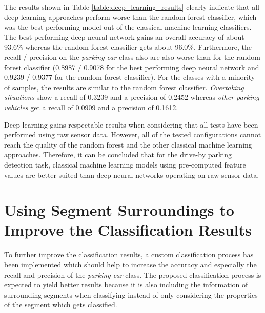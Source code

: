 The results shown in Table \ref{table:deep_learning_results} clearly indicate that all deep learning approaches perform worse than the random forest classifier, which was the best performing model out of the classical machine learning classifiers. The best performing deep neural network gains an overall accuracy of about 93.6\% whereas the random forest classifier gets about 96.0\%. Furthermore, the recall / precision on the \emph{parking car}-class also are also worse than for the random forest classifier (0.8987 / 0.9078 for the best performing deep neural network and 0.9239 / 0.9377 for the random forest classifier). For the classes with a minority of samples, the results are similar to the random forest classifier. \emph{Overtaking situations} show a recall of 0.3239 and a precision of 0.2452 whereas \emph{other parking vehicles} get a recall of 0.0909 and a precision of 0.1612.

Deep learning gains respectable results when considering that all tests have been performed using raw sensor data. However, all of the tested configurations cannot reach the quality of the random forest and the other classical machine learning approaches. Therefore, it can be concluded that for the drive-by parking detection task, classical machine learning models using pre-computed feature values are better suited than deep neural networks operating on raw sensor data.






\section{Using Segment Surroundings to Improve the Classification Results}
\label{sec:using_surroundings_to_improve_results}

To further improve the classification results, a custom classification process has been implemented which should help to increase the accuracy and especially the recall and precision of the \emph{parking car}-class. The proposed classification process is expected to yield better results because it is also including the information of surrounding segments when classifying instead of only considering the properties of the segment which gets classified.

